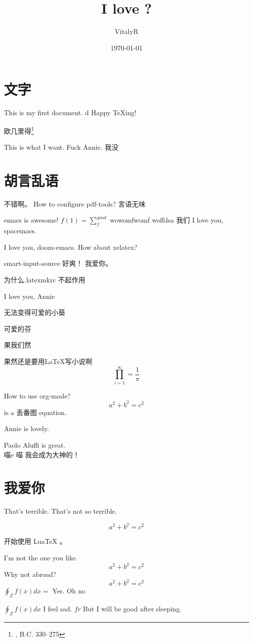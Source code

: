 \documentclass[UTF8]{ctexart}
\title{I love ?}
\author{VitalyR}
\date{\today}
\begin{document}
\maketitle
\tableofcontents

\section{文字}
This is my first document.
d
Happy \TeX ing!

欧几里得\footnote{, B.C. 330--275}

This is what I want.
Fuck Annie.
我没

\section{胡言乱语}

不错啊。
How to configure pdf-tools?
言语无味

emacs is awesome!
\(f(1)=\sum_{f}^{good}\)
wowomfwomf woffdsa
我们
I love you, spacemacs.

I love you, doom-emacs.
How about xelatex?


smart-input-source 好爽！
我爱你。

为什么.latexmkrc 不起作用

I love you, Annie

无法变得可爱的小葵

可爱的芬

果我们然

果然还是要用\LaTeX 写小说啊
\begin{equation}
	\prod_{i=1}^{\infty}=\frac{1}{\pi}
\end{equation}

How to use org-mode?
\[a^{2}+b^{2}=c^{2}\] is a 丢番图 equation.

Annie is lovely.

Paolo Aluffi is great.\\
喵e
喵
我会成为大神的！

\section{我爱你}

That's terrible.
That's not so terrible.

\begin{equation}
	\label{eq:2}
	a^{2}+b^{2}=c^{2}
\end{equation}

开始使用 LuaTeX 。

I'm not the one you like.
\[a^{2}+b^{2}=c^{2}\]
Why not abroad?
\[a^{2}+b^{2}=c^{2}\] \(\oint_{Z}f(x)dx = \) Yes.
Oh
no

\(\oint_{Z}f(x)dx\)
I feel sad.
\(fr\)
But I will be good after sleeping.
\end{document}

